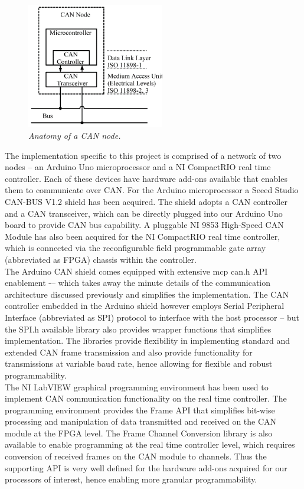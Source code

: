 \documentclass{article}
\begin{document}
\begin{figure}[!ht]
\centering 
\includegraphics[width=6cm]{fig_4.png}
\caption{\small \sl Anatomy of a CAN node.}  
\end{figure}

\noindent The implementation specific to this project is comprised of a network of two nodes – an Arduino Uno microprocessor and a NI CompactRIO real time controller. Each of these devices have hardware add-ons available that enables them to communicate over CAN. For the Arduino microprocessor a Seeed Studio CAN-BUS V1.2 shield has been acquired. The shield adopts a CAN controller and a CAN transceiver, which can be directly plugged into our Arduino Uno board to provide CAN bus capability. A pluggable NI 9853 High-Speed CAN Module has also been acquired for the NI CompactRIO real time controller, which is connected via the reconfigurable field programmable gate array (abbreviated as FPGA) chassis within the controller. \\

\noindent The Arduino CAN shield comes equipped with extensive mcp can.h API enablement -– which takes away the minute details of the communication architecture discussed previously and simplifies the implementation. The CAN controller embedded in the Arduino shield however employs Serial Peripheral Interface (abbreviated as SPI) protocol to interface with the host processor – but the SPI.h available library also provides wrapper functions that simplifies implementation. The libraries provide flexibility in implementing standard and extended CAN frame transmission and also provide functionality for transmissions at variable baud rate, hence allowing for flexible and robust programmability. \\


\noindent The NI LabVIEW graphical programming environment has been used to implement CAN communication functionality on the real time controller. The programming environment provides the Frame API that simplifies bit-wise processing and manipulation of data transmitted and received on the CAN module at the FPGA level. The Frame Channel Conversion library is also available to enable programming at the real time controller level, which requires conversion of received frames on the CAN module to channels. Thus the supporting API is very well defined for the hardware add-ons acquired for our processors of interest, hence enabling more granular programmability.
\end{document}
